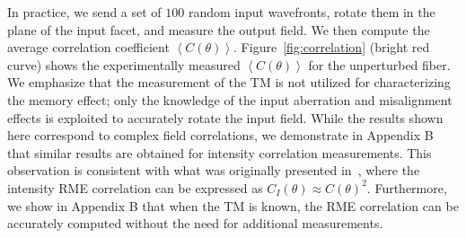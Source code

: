 \documentclass[aps,prl,twocolumn, amsmath,amssymb,superscriptaddress]{revtex4-2}
\begin{document}
In practice, we send a set of $100$ random input wavefronts, 
rotate them in the plane of the input facet,
and measure the output field.
We then compute the average correlation coefficient $\left\langle C(\theta)\right\rangle$. 
Figure~\ref{fig:correlation} (bright red curve) 
shows the experimentally measured $\left\langle C(\theta)\right\rangle$ 
for the unperturbed fiber.
We emphasize that the measurement of the TM is not utilized for characterizing the memory effect; 
only the knowledge of the input aberration and misalignment effects is exploited 
to accurately rotate the input field.
While the results shown here correspond to complex field correlations, 
we demonstrate in Appendix B that similar results are obtained 
for intensity correlation measurements. 
This observation is consistent with what was originally presented in~\cite{amitonova2015rotational},
where the intensity RME correlation can be expressed as $C_I(\theta) \approx C(\theta)^2$. 
Furthermore, we show in Appendix B that when the TM is known, 
the RME correlation can be accurately computed without the need for additional measurements.
\end{document}
